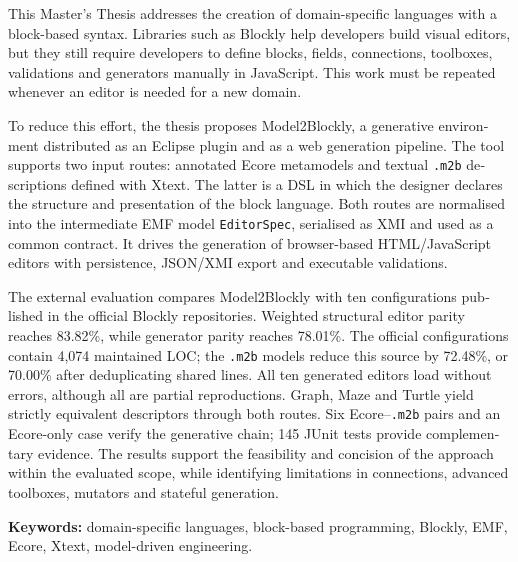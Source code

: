 \begin{english}
This Master's Thesis addresses the creation of domain-specific languages with a
block-based syntax. Libraries such as Blockly help developers build visual
editors, but they still require developers to define blocks, fields,
connections, toolboxes, validations and generators manually in JavaScript. This
work must be repeated whenever an editor is needed for a new domain.

To reduce this effort, the thesis proposes Model2Blockly, a generative
environment distributed as an Eclipse plugin and as a web generation pipeline.
The tool supports two input routes: annotated Ecore metamodels and textual
\texttt{.m2b} descriptions defined with Xtext. The latter is a DSL in which the
designer declares the structure and presentation of the block language. Both
routes are normalised into the intermediate EMF model \texttt{EditorSpec},
serialised as XMI and used as a common contract. It drives the generation of
browser-based HTML/JavaScript editors with persistence, JSON/XMI export and
executable validations.

The external evaluation compares Model2Blockly with ten configurations
published in the official Blockly repositories. Weighted structural editor
parity reaches 83.82\%, while generator parity reaches 78.01\%. The official
configurations contain 4,074 maintained LOC; the \texttt{.m2b} models reduce
this source by 72.48\%, or 70.00\% after deduplicating shared lines. All ten
generated editors load without errors, although all are partial reproductions.
Graph, Maze and Turtle yield strictly equivalent descriptors through both
routes. Six Ecore--\texttt{.m2b} pairs and an Ecore-only case verify the
generative chain; 145 JUnit tests provide complementary evidence. The results
support the
feasibility and concision of the approach
within the evaluated scope, while identifying limitations in connections,
advanced toolboxes, mutators and stateful generation.

\noindent\textbf{Keywords:} domain-specific languages, block-based programming,
Blockly, EMF, Ecore, Xtext, model-driven engineering.
\end{english}
